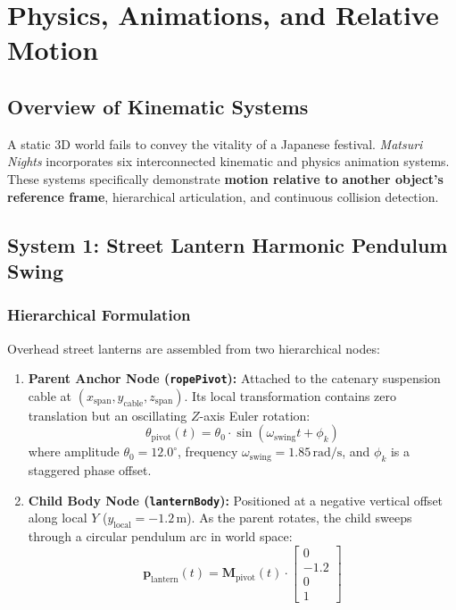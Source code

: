 \chapter{Physics, Animations, and Relative Motion}
\label{chap:animations}

\section{Overview of Kinematic Systems}
A static 3D world fails to convey the vitality of a Japanese festival. \textit{Matsuri Nights} incorporates six interconnected kinematic and physics animation systems. These systems specifically demonstrate \textbf{motion relative to another object's reference frame}, hierarchical articulation, and continuous collision detection.

\section{System 1: Street Lantern Harmonic Pendulum Swing}
\subsection{Hierarchical Formulation}
Overhead street lanterns are assembled from two hierarchical nodes:
\begin{enumerate}
    \item \textbf{Parent Anchor Node (\texttt{ropePivot}):} Attached to the catenary suspension cable at $(x_{\text{span}}, y_{\text{cable}}, z_{\text{span}})$. Its local transformation contains zero translation but an oscillating $Z$-axis Euler rotation:
    \begin{equation}
    \theta_{\text{pivot}}(t) = \theta_0 \cdot \sin(\omega_{\text{swing}} t + \phi_k)
    \end{equation}
    where amplitude $\theta_0 = 12.0^\circ$, frequency $\omega_{\text{swing}} = 1.85\,\text{rad/s}$, and $\phi_k$ is a staggered phase offset.
    \item \textbf{Child Body Node (\texttt{lanternBody}):} Positioned at a negative vertical offset along local $Y$ ($y_{\text{local}} = -1.2\,\text{m}$). As the parent rotates, the child sweeps through a circular pendulum arc in world space:
    \begin{equation}
    \mathbf{p}_{\text{lantern}}(t) = \mathbf{M}_{\text{pivot}}(t) \cdot \begin{bmatrix} 0 \\ -1.2 \\ 0 \\ 1 \end{bmatrix}
    \end{equation}
\end{enumerate}

